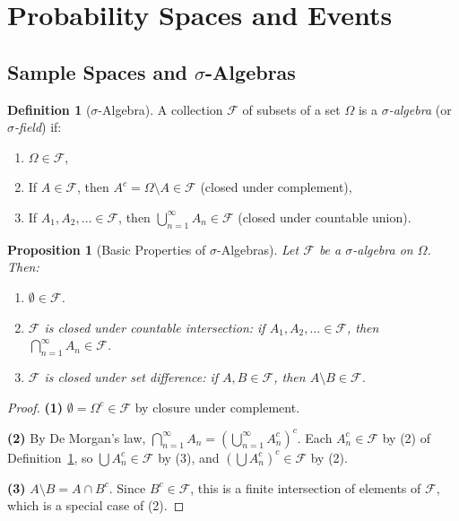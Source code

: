 \documentclass[11pt,a4paper]{article}
\theoremstyle{definition}
\newtheorem{definition}{Definition}[section]
\theoremstyle{plain}
\newtheorem{proposition}[theorem]{Proposition}
\theoremstyle{remark}
\begin{document}
\section{Probability Spaces and Events}
\label{sec:prob_spaces}

\subsection{Sample Spaces and \texorpdfstring{$\sigma$}{Sigma}-Algebras}
\label{subsec:sigma_algebras}

\begin{definition}[$\sigma$-Algebra]
\label{def:sigma_algebra}
A collection $\mathcal{F}$ of subsets of a set $\Omega$ is a \emph{$\sigma$-algebra}
(or \emph{$\sigma$-field}) if:
\begin{enumerate}[nosep]
    \item $\Omega \in \mathcal{F}$,
    \item If $A \in \mathcal{F}$, then $A^c = \Omega \setminus A \in \mathcal{F}$ \hfill(closed under complement),
    \item If $A_1, A_2, \ldots \in \mathcal{F}$, then $\bigcup_{n=1}^\infty A_n \in \mathcal{F}$ \hfill(closed under countable union).
\end{enumerate}
\end{definition}

\begin{proposition}[Basic Properties of $\sigma$-Algebras]
\label{prop:sigma_props}
Let $\mathcal{F}$ be a $\sigma$-algebra on $\Omega$. Then:
\begin{enumerate}[nosep]
    \item $\emptyset \in \mathcal{F}$.
    \item $\mathcal{F}$ is closed under countable intersection: if $A_1, A_2, \ldots \in \mathcal{F}$, then $\bigcap_{n=1}^\infty A_n \in \mathcal{F}$.
    \item $\mathcal{F}$ is closed under set difference: if $A, B \in \mathcal{F}$, then $A \setminus B \in \mathcal{F}$.
\end{enumerate}
\end{proposition}

\begin{proof}
\textbf{(1)} $\emptyset = \Omega^c \in \mathcal{F}$ by closure under complement.

\textbf{(2)} By De Morgan's law, $\bigcap_{n=1}^\infty A_n = \left(\bigcup_{n=1}^\infty A_n^c\right)^c$. Each $A_n^c \in \mathcal{F}$ by (2) of Definition~\ref{def:sigma_algebra}, so $\bigcup A_n^c \in \mathcal{F}$ by (3), and $\left(\bigcup A_n^c\right)^c \in \mathcal{F}$ by (2).

\textbf{(3)} $A \setminus B = A \cap B^c$. Since $B^c \in \mathcal{F}$, this is a finite intersection of elements of $\mathcal{F}$, which is a special case of (2).
\end{proof}
\end{document}
